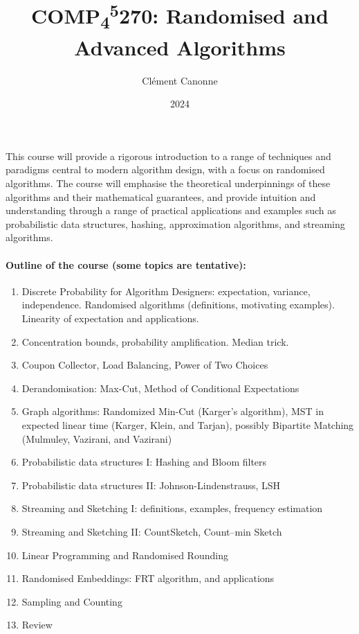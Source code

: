 \documentclass[a4paper]{tufte-book}
\title{COMP\textsubscript{4}\textsuperscript{5}270: Randomised and Advanced Algorithms}
\author{Cl\'ement Canonne}
\date{2024}
\begin{document}
\frontmatter
\maketitle
This course will provide a rigorous introduction to a range of techniques and paradigms central to modern algorithm design, with a focus on randomised algorithms. The course will 
emphasise the theoretical underpinnings of these algorithms and their mathematical guarantees, and provide intuition and understanding through a range of practical applications and examples such as probabilistic data structures, hashing, approximation algorithms, and streaming algorithms.


\paragraph{Outline of the course (some topics are tentative):}
\begin{enumerate}
    \item Discrete Probability for Algorithm Designers: expectation, variance, independence. Randomised algorithms (definitions, motivating examples). Linearity of expectation and applications.
    \item Concentration bounds, probability amplification. Median trick.
    \item Coupon Collector, Load Balancing, Power of Two Choices
    \item Derandomisation: Max-Cut, Method of Conditional Expectations
    \item Graph algorithms: Randomized Min-Cut (Karger’s algorithm), MST in expected linear time (Karger, Klein, and Tarjan), possibly Bipartite Matching (Mulmuley, Vazirani, and Vazirani)
    \item Probabilistic data structures I: Hashing and Bloom filters
    \item Probabilistic data structures II: Johnson-Lindenstrauss, LSH
    \item Streaming and Sketching I: definitions, examples, frequency estimation
    \item Streaming and Sketching II: CountSketch, Count–min Sketch
    \item Linear Programming and Randomised Rounding
    \item Randomised Embeddings: FRT algorithm, and applications
    \item Sampling and Counting
    \item Review
\end{enumerate}
\end{document}
